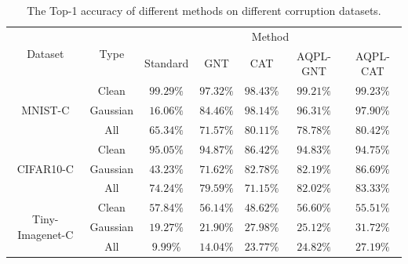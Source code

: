 \documentclass[letterpaper]{article} %
\begin{document}
\begin{table}[!t]		
	\centering
	\begin{tabular}{c|c|ccccc}
		\hline
		\multirow{2}{*}{Dataset} & \multirow{2}{*}{Type}
		&\multicolumn{5}{c}{Method}\\
		\cline{3-7}
		&&Standard & GNT & CAT & AQPL-GNT & AQPL-CAT\\
		\hline
		\multirow{3}{*}{MNIST-C}
		& Clean & $\bm{99.29\%}$ & $97.32\%$ & $98.43\%$ & $99.21\%$ & $99.23\%$ \\
		& Gaussian & $16.06\%$ & $84.46\%$ & $\bm{98.14\%}$ & $96.31\%$ & $97.90\%$ \\
		& All & $65.34\%$ & $71.57\%$ & $80.11\%$ & $78.78\%$ & $\bm{80.42\%}$ \\
		\hline
		
		\multirow{3}{*}{CIFAR10-C}
		& Clean & $\bm{95.05\%}$ & $94.87\%$ & $86.42\%$ & $94.83\%$ & $94.75\%$ \\
		& Gaussian & $43.23\%$ & $71.62\%$ & $82.78\%$ & $82.19\%$ & $\bm{86.69\%}$ \\
		& All & $74.24\%$ & $79.59\%$ & $71.15\%$ & $82.02\%$ & $\bm{83.33\%}$ \\
		\hline
		
		\multirow{3}{*}{Tiny-Imagenet-C}
		& Clean & $\bm{57.84\%}$ & $56.14\%$ & $48.62\%$ & $56.60\%$ & $55.51\%$ \\
		& Gaussian & $19.27\%$ & $21.90\%$ & $27.98\%$ & $25.12\%$ & $\bm{31.72\%}$ \\
		& All & $9.99\%$ & $14.04\%$ & $23.77\%$ & $24.82\%$ & $\bm{27.19\%}$ \\
		
		\hline
	\end{tabular}
	\caption{The Top-1 accuracy of different methods on different corruption datasets.}
	\label{table:comparison}
\end{table}


		
\end{document}
